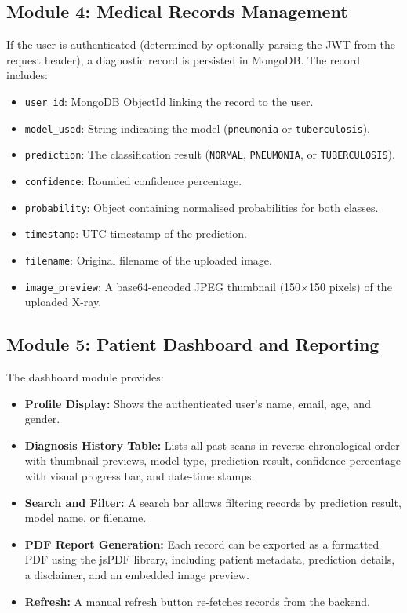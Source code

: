 \documentclass[12pt, a4paper, oneside]{report}
\begin{document}
\subsection{Module 4: Medical Records Management}
\label{subsec:mod_records}

If the user is authenticated (determined by optionally parsing the JWT from the request header), a diagnostic record is persisted in MongoDB. The record includes:

\begin{itemize}
    \item \texttt{user\_id}: MongoDB ObjectId linking the record to the user.
    \item \texttt{model\_used}: String indicating the model (\texttt{pneumonia} or \texttt{tuberculosis}).
    \item \texttt{prediction}: The classification result (\texttt{NORMAL}, \texttt{PNEUMONIA}, or \texttt{TUBERCULOSIS}).
    \item \texttt{confidence}: Rounded confidence percentage.
    \item \texttt{probability}: Object containing normalised probabilities for both classes.
    \item \texttt{timestamp}: UTC timestamp of the prediction.
    \item \texttt{filename}: Original filename of the uploaded image.
    \item \texttt{image\_preview}: A base64-encoded JPEG thumbnail (150$\times$150 pixels) of the uploaded X-ray.
\end{itemize}

\subsection{Module 5: Patient Dashboard and Reporting}
\label{subsec:mod_dashboard}

The dashboard module provides:

\begin{itemize}
    \item \textbf{Profile Display:} Shows the authenticated user's name, email, age, and gender.
    \item \textbf{Diagnosis History Table:} Lists all past scans in reverse chronological order with thumbnail previews, model type, prediction result, confidence percentage with visual progress bar, and date-time stamps.
    \item \textbf{Search and Filter:} A search bar allows filtering records by prediction result, model name, or filename.
    \item \textbf{PDF Report Generation:} Each record can be exported as a formatted PDF using the jsPDF library, including patient metadata, prediction details, a disclaimer, and an embedded image preview.
    \item \textbf{Refresh:} A manual refresh button re-fetches records from the backend.
\end{itemize}
\end{document}
